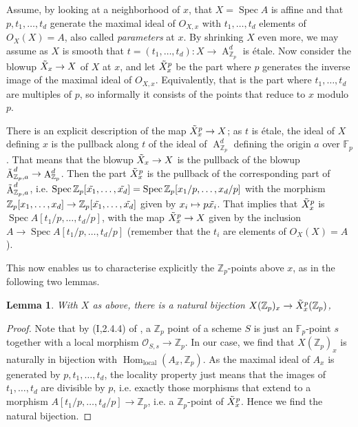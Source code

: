 \documentclass{article}
\newcommand{\Z}{\mathbb{Z}}
\renewcommand{\O}{\mathcal{O}}
\newcommand{\F}{\mathbb{F}}
\DeclareMathOperator{\Hom}{Hom}
\DeclareMathOperator{\Spec}{Spec}
\DeclareMathOperator{\A}{A}
\theoremstyle{plain}
\newtheorem{lem}[thm]{Lemma} %
\theoremstyle{definition}
\theoremstyle{remark}
\begin{document}
Assume, by looking at a neighborhood of $x$, that $X = \Spec A$ is affine and that $p,t_1,\dots,t_d$ generate the maximal ideal of $O_{X,x}$ with $t_1,\dots,t_d$ elements of $O_X(X) = A$, also called \textit{parameters} at $x$. By shrinking $X$ even more, we may assume as $X$ is smooth that $t = (t_1,\dots,t_d): X \to \A^d_{\Z_p}$ is \'etale. Now consider the blowup $\Tilde{X}_x \to X$ of $X$ at $x$, and let $\Tilde{X}_x^p$ be the part where $p$ generates the inverse image of the maximal ideal of $O_{X,x}$. Equivalently, that is the part where $t_1,\dots,t_d$ are multiples of $p$, so informally it consists of the points that reduce to $x$ modulo $p$.

There is an explicit description of the map $\Tilde{X}_x^p \to X$; as $t$ is \'etale, the ideal of $X$ defining $x$ is the pullback along $t$ of the ideal of $\A^d_{\Z_p}$ defining the origin $a$ over $\F_p$. That means that the blowup $\Tilde{X}_x \to X$ is the pullback of the blowup $\Tilde{\A}^d_{\Z_p,a} \to \A_{\Z_p}^d$. Then the part $\Tilde{X}_x^p$ is the pullback of the corresponding part of $\Tilde{\A}^d_{\Z_p,a}$, i.e. $\Spec \Z_p[\Tilde{x_1},\dots,\Tilde{x_d}] = \Spec \Z_p[x_1/p,\dots,x_d/p]$ with the morphism $\Z_p[x_1,\dots,x_d] \to \Z_p[\Tilde{x_1},\dots,\tilde{x_d}]$ given by $x_i \mapsto p\Tilde{x_i}$. That implies that $\Tilde{X}_x^p$ is $\Spec A[t_1/p,\dots,t_d/p]$, with the map $\Tilde{X}_x^p \to X$ given by the inclusion $A \to \Spec A[t_1/p,\dots,t_d/p]$ (remember that the $t_i$ are elements of $O_X(X) = A$).

This now enables us to characterise explicitly the $\Z_p$-points above $x$, as in the following two lemmas.

\begin{lem}
With $X$ as above, there is a natural bijection $X(\Z_p)_x \to \Tilde{X}_x^p(\Z_p)$,
\end{lem}
\begin{proof}
Note that by (I,2.4.4) of \cite{ega}, a $\Z_p$ point of a scheme $S$ is just an $\F_p$-point $s$ together with a local morphism $\O_{S,s} \to \Z_p$. In our case, we find that $X(\Z_p)_x$ is naturally in bijection with $\Hom_{\text{local}}(A_x,\Z_p)$. As the maximal ideal of $A_x$ is generated by $p,t_1,\dots,t_d$, the locality property just means that the images of $t_1,\dots,t_d$ are divisible by $p$, i.e. exactly those morphisms that extend to a morphism $A[t_1/p,\dots,t_d/p] \to \Z_p$, i.e. a $\Z_p$-point of $\Tilde{X}_x^p$. Hence we find the natural bijection.
\end{proof}
\end{document}
